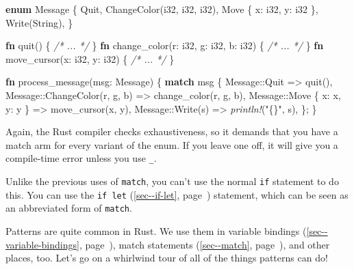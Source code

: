 \documentclass[a4paper,]{book}
\renewcommand*{\hyperref}[2][\ar]{%
  \def\ar{#2}%
  #2 (\autoref{#1}, page~\pageref{#1})}
\newenvironment{Shaded}{\begin{snugshade}}{\end{snugshade}}
\newcommand{\KeywordTok}[1]{\textcolor[rgb]{0.13,0.29,0.53}{\textbf{{#1}}}}
\newcommand{\DataTypeTok}[1]{\textcolor[rgb]{0.13,0.29,0.53}{{#1}}}
\newcommand{\StringTok}[1]{\textcolor[rgb]{0.31,0.60,0.02}{{#1}}}
\newcommand{\CommentTok}[1]{\textcolor[rgb]{0.56,0.35,0.01}{\textit{{#1}}}}
\newcommand{\PreprocessorTok}[1]{\textcolor[rgb]{0.56,0.35,0.01}{\textit{{#1}}}}
\newcommand{\NormalTok}[1]{{#1}}
\begin{document}
\begin{Shaded}
\begin{Highlighting}[]
\KeywordTok{enum} \NormalTok{Message \{}
    \NormalTok{Quit,}
    \NormalTok{ChangeColor(}\DataTypeTok{i32}\NormalTok{, }\DataTypeTok{i32}\NormalTok{, }\DataTypeTok{i32}\NormalTok{),}
    \NormalTok{Move \{ x: }\DataTypeTok{i32}\NormalTok{, y: }\DataTypeTok{i32} \NormalTok{\},}
    \NormalTok{Write(}\DataTypeTok{String}\NormalTok{),}
\NormalTok{\}}

\KeywordTok{fn} \NormalTok{quit() \{ }\CommentTok{/* ... */} \NormalTok{\}}
\KeywordTok{fn} \NormalTok{change_color(r: }\DataTypeTok{i32}\NormalTok{, g: }\DataTypeTok{i32}\NormalTok{, b: }\DataTypeTok{i32}\NormalTok{) \{ }\CommentTok{/* ... */} \NormalTok{\}}
\KeywordTok{fn} \NormalTok{move_cursor(x: }\DataTypeTok{i32}\NormalTok{, y: }\DataTypeTok{i32}\NormalTok{) \{ }\CommentTok{/* ... */} \NormalTok{\}}

\KeywordTok{fn} \NormalTok{process_message(msg: Message) \{}
    \KeywordTok{match} \NormalTok{msg \{}
        \NormalTok{Message::Quit => quit(),}
        \NormalTok{Message::ChangeColor(r, g, b) => change_color(r, g, b),}
        \NormalTok{Message::Move \{ x: x, y: y \} => move_cursor(x, y),}
        \NormalTok{Message::Write(s) => }\PreprocessorTok{println!}\NormalTok{(}\StringTok{"\{\}"}\NormalTok{, s),}
    \NormalTok{\};}
\NormalTok{\}}
\end{Highlighting}
\end{Shaded}

Again, the Rust compiler checks exhaustiveness, so it demands that you
have a match arm for every variant of the enum. If you leave one off, it
will give you a compile-time error unless you use \texttt{\_}.

Unlike the previous uses of \texttt{match}, you can't use the normal
\texttt{if} statement to do this. You can use the
\hyperref[sec--if-let]{\texttt{if\ let}} statement, which can be seen as
an abbreviated form of \texttt{match}.


Patterns are quite common in Rust. We use them in
\hyperref[sec--variable-bindings]{variable bindings},
\hyperref[sec--match]{match statements}, and other places, too. Let's go
on a whirlwind tour of all of the things patterns can do!
\end{document}
